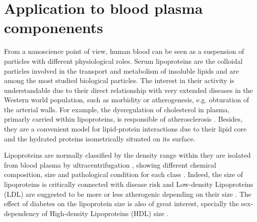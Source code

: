 



\section{Application to blood plasma componenents}

From a nanoscience point of view, human blood can be seen as a suspension of particles with different physiological roles. Serum lipoproteins are the colloidal particles involved in the transport and metabolism of insoluble lipids and are among the most studied biological particles. The interest in their activity is understandable due to their direct relationship with very extended diseases in the Western world population, such as morbidity or atherogenesis, e.g. obturation of the arterial walls. For example, the dysregulation of cholesterol in plasma, primarly carried within lipoproteins, is responsible of atherosclerosis \cite{munro_pathogenesis_1988}. Besides, they are a convenient model for lipid-protein interactions \cite{assmann_lipid-protein_1974} due to their lipid core and the hydrated proteins isometrically situated on its surface.

Lipoproteins are normally classified by the density range within they are isolated from blood plasma by ultracentrifugation \cite{havel_distribution_1955}, showing different chemical composition, size and pathological condition for each class \cite{german_lipoproteins:_2006}. Indeed, the size of lipoproteins is critically connected with disease risk \cite{gardner_cd_association_1996} and Low-density Lipoproteins (LDL) are suggested to be more or less atherogenic depending on their size \cite{dreon_low-density_1994}. The effect of diabetes on the lipoprotein size is also of great interest, specially the sex-dependency of High-density Lipoproteins (HDL) size \cite{colhoun_lipoprotein_2002}.

